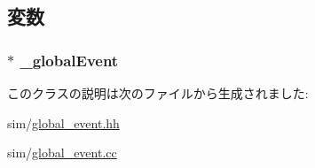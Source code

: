 \subsection{変数}
\hypertarget{classBaseGlobalEvent_1_1BarrierEvent_ac2b463c3aa6e837d82bc03a267c8e4eb}{
\subsubsection[{\_\-globalEvent}]{$\ast$ {\bf \_\-globalEvent}}}
\label{classBaseGlobalEvent_1_1BarrierEvent_ac2b463c3aa6e837d82bc03a267c8e4eb}


このクラスの説明は次のファイルから生成されました:\begin{DoxyCompactItemize}
\item 
sim/\hyperlink{global__event_8hh}{global\_\-event.hh}\item 
sim/\hyperlink{global__event_8cc}{global\_\-event.cc}\end{DoxyCompactItemize}
